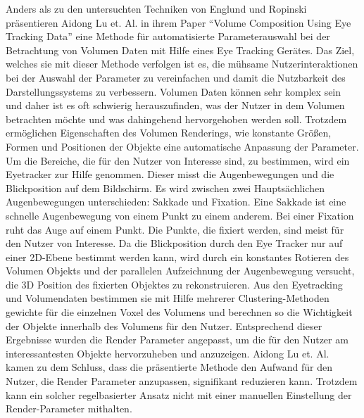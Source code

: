 Anders als zu den untersuchten Techniken von Englund und Ropinski \cite{doi:10.1111/cgf.13320} präsentieren Aidong Lu et. Al. in ihrem Paper \enquote{Volume Composition Using Eye Tracking Data} \cite{Lu:2006:VCU:2384796.2384814} eine Methode für automatisierte Parameterauswahl bei der Betrachtung von Volumen Daten mit Hilfe eines Eye Tracking Gerätes.
Das Ziel, welches sie mit dieser Methode verfolgen ist es, die mühsame Nutzerinteraktionen bei der Auswahl der Parameter zu vereinfachen und damit die Nutzbarkeit des Darstellungssystems zu verbessern.
Volumen Daten können sehr komplex sein und daher ist es oft schwierig herauszufinden, was der Nutzer in dem Volumen betrachten möchte und was dahingehend hervorgehoben werden soll.
Trotzdem ermöglichen Eigenschaften des Volumen Renderings, wie konstante Größen, Formen und Positionen der Objekte eine automatische Anpassung der Parameter.
Um die Bereiche, die für den Nutzer von Interesse sind, zu bestimmen, wird ein Eyetracker zur Hilfe genommen.
Dieser misst die Augenbewegungen und die Blickposition auf dem Bildschirm.
Es wird zwischen zwei Hauptsächlichen Augenbewegungen unterschieden: Sakkade und Fixation.
Eine Sakkade ist eine schnelle Augenbewegung von einem Punkt zu einem anderem.
Bei einer Fixation ruht das Auge auf einem Punkt.
Die Punkte, die fixiert werden, sind meist für den Nutzer von Interesse.
Da die Blickposition durch den Eye Tracker nur auf einer 2D-Ebene bestimmt werden kann, wird durch ein konstantes Rotieren des Volumen Objekts und der parallelen Aufzeichnung der Augenbewegung versucht, die 3D Position des fixierten Objektes zu rekonstruieren.
Aus den Eyetracking und Volumendaten bestimmen sie mit Hilfe mehrerer Clustering-Methoden gewichte für die einzelnen Voxel des Volumens und berechnen so die Wichtigkeit der Objekte innerhalb des Volumens für den Nutzer.
Entsprechend dieser Ergebnisse wurden die Render Parameter angepasst, um die für den Nutzer am interessantesten Objekte hervorzuheben und anzuzeigen.
Aidong Lu et. Al. kamen zu dem Schluss, dass die präsentierte Methode den Aufwand für den Nutzer, die Render Parameter anzupassen, signifikant reduzieren kann.
Trotzdem kann ein solcher regelbasierter Ansatz nicht mit einer manuellen Einstellung der Render-Parameter mithalten.


